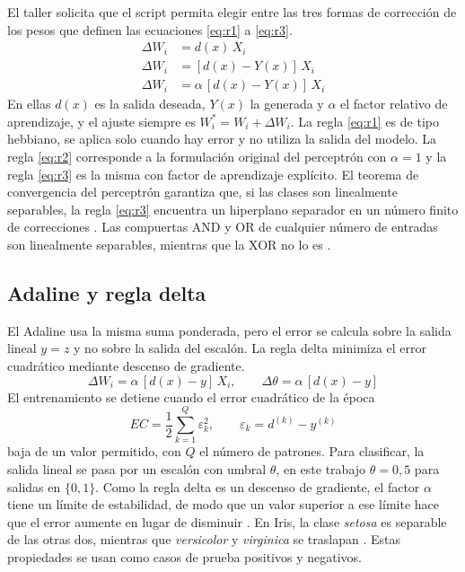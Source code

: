 \documentclass[conference]{IEEEtran}
\begin{document}
El taller solicita que el script permita elegir entre las tres formas de correcci\'on de los pesos que definen las ecuaciones \eqref{eq:r1} a \eqref{eq:r3}.
\begin{align}
  \Delta W_i &= d(x)\, X_i \label{eq:r1} \\
  \Delta W_i &= [d(x) - Y(x)]\, X_i \label{eq:r2} \\
  \Delta W_i &= \alpha\, [d(x) - Y(x)]\, X_i \label{eq:r3}
\end{align}
En ellas $d(x)$ es la salida deseada, $Y(x)$ la generada y $\alpha$ el factor relativo de aprendizaje, y el ajuste siempre es $W_i^{*} = W_i + \Delta W_i$. La regla \eqref{eq:r1} es de tipo hebbiano, se aplica solo cuando hay error y no utiliza la salida del modelo. La regla \eqref{eq:r2} corresponde a la formulaci\'on original del perceptr\'on con $\alpha = 1$ y la regla \eqref{eq:r3} es la misma con factor de aprendizaje expl\'icito. El teorema de convergencia del perceptr\'on garantiza que, si las clases son linealmente separables, la regla \eqref{eq:r3} encuentra un hiperplano separador en un n\'umero finito de correcciones \cite{haykin2009}. Las compuertas AND y OR de cualquier n\'umero de entradas son linealmente separables, mientras que la XOR no lo es \cite{minsky1969}.

\subsection{Adaline y regla delta}

El Adaline usa la misma suma ponderada, pero el error se calcula sobre la salida lineal $y = z$ y no sobre la salida del escal\'on. La regla delta minimiza el error cuadr\'atico mediante descenso de gradiente.
\begin{equation}
  \Delta W_i = \alpha\, [d(x) - y]\, X_i, \qquad \Delta \theta = \alpha\, [d(x) - y]
  \label{eq:delta}
\end{equation}
El entrenamiento se detiene cuando el error cuadr\'atico de la \'epoca
\begin{equation}
  EC = \frac{1}{2}\sum_{k=1}^{Q} \varepsilon_k^2, \qquad \varepsilon_k = d^{(k)} - y^{(k)}
  \label{eq:ec}
\end{equation}
baja de un valor permitido, con $Q$ el n\'umero de patrones. Para clasificar, la salida lineal se pasa por un escal\'on con umbral $\theta$, en este trabajo $\theta = 0{,}5$ para salidas en $\{0,1\}$. Como la regla delta es un descenso de gradiente, el factor $\alpha$ tiene un l\'imite de estabilidad, de modo que un valor superior a ese l\'imite hace que el error aumente en lugar de disminuir \cite{haykin2009}. En Iris, la clase \textit{setosa} es separable de las otras dos, mientras que \textit{versicolor} y \textit{virginica} se traslapan \cite{fisher1936}. Estas propiedades se usan como casos de prueba positivos y negativos.
\end{document}

